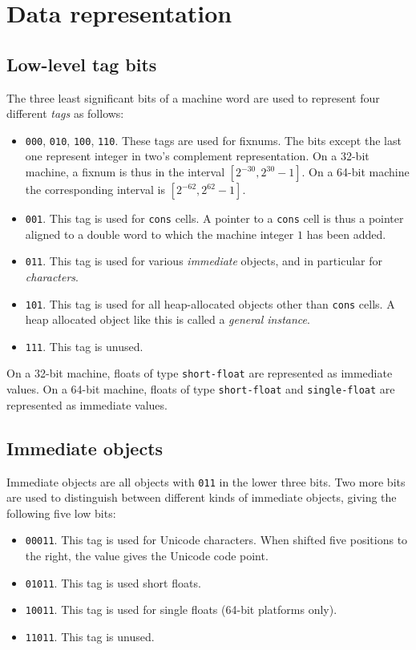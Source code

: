 \chapter{Data representation}
\label{chap-data-representation}

\section{Low-level tag bits}

The three least significant bits of a machine word are used to
represent four different \emph{tags} as follows:

\begin{itemize}
\item \texttt{000}, \texttt{010}, \texttt{100}, \texttt{110}.  These
  tags are used for fixnums.  The bits except the last one represent
  integer in two's complement representation.  On a 32-bit machine, a
  fixnum is thus in the interval $[2^{-30}, 2^{30} - 1]$.  On a 64-bit
  machine the corresponding interval is $[2^{-62}, 2^{62} - 1]$.
\item \texttt{001}.  This tag is used for \texttt{cons} cells.  A
  pointer to a \texttt{cons} cell is thus a pointer aligned to a
  double word to which the machine integer $1$ has been added.
\item \texttt{011}.  This tag is used for various \emph{immediate}
  objects, and in particular for \emph{characters}.
\item \texttt{101}.  This tag is used for all heap-allocated objects
  other than \texttt{cons} cells.  A heap allocated object like this
  is called a \emph{general instance}.
\item \texttt{111}.  This tag is unused.
\end{itemize}

On a 32-bit machine, floats of type \texttt{short-float} are
represented as immediate values.  On a 64-bit machine, floats of type
\texttt{short-float} and \texttt{single-float} are represented as
immediate values.

\section{Immediate objects}

Immediate objects are all objects with \texttt{011} in the lower three
bits.  Two more bits are used to distinguish between different kinds
of immediate objects, giving the following five low bits:

\begin{itemize}
\item \texttt{00011}.  This tag is used for Unicode characters.  When
  shifted five positions to the right, the value gives the Unicode
  code point.
\item \texttt{01011}.  This tag is used short floats.
\item \texttt{10011}.  This tag is used for single floats (64-bit
  platforms only).
\item \texttt{11011}.  This tag is unused.
\end{itemize}

